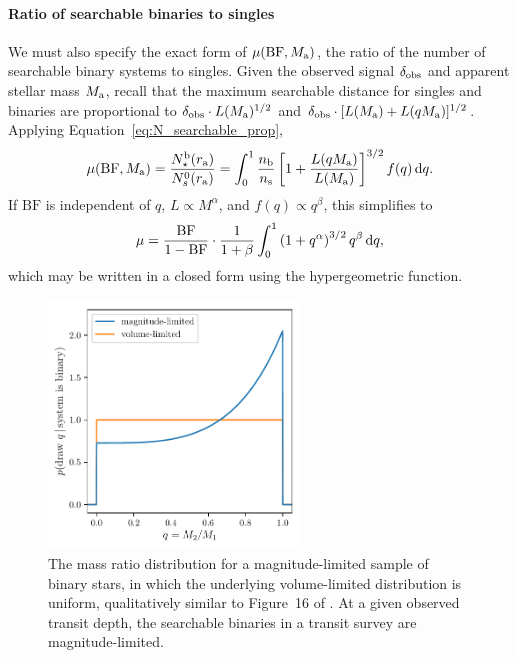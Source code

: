 \documentclass[12pt,modern]{aastex61}
\renewcommand{\a}{_{\rm a}}
\begin{document}
\paragraph{Ratio of searchable binaries to singles}
We must also specify the exact form of $\mu({\rm BF},M\a)$, the ratio of 
the number of searchable binary systems to singles.
Given the observed signal $\delta_{\rm obs}$ and apparent stellar mass $M\a$, 
recall that the maximum searchable distance for singles and binaries are 
proportional to $\delta_{\rm obs}\cdot L(M\a)^{1/2}$ and $\delta_{\rm 
obs}\cdot [L(M\a)+L(qM\a)]^{1/2}$.
Applying Equation~\ref{eq:N_searchable_prop},
\begin{equation}
\mu({\rm BF},M\a) = 
\frac{N_\star^{\rm b}(r\a)}{N_s^0(r\a)}=
\int_0^1 {n_{\rm b}\over n_{\rm s}}\left[1+{L(qM\a) \over L(M\a)}\right]^{3/2} 
f(q)\,\mathrm{d}q.
\label{eq:mu_general}
\end{equation}
If $\mathrm{BF}$ is independent of $q$, $L \propto M^\alpha$, and $f(q) 
\propto q^\beta$, this simplifies to
\begin{equation}
\mu =\frac{{\rm BF}}{1 - {\rm BF}}\cdot {1\over{1+\beta}}\int_0^1 
\left(1+q^\alpha\right)^{3/2} q^\beta \,\mathrm{d}q,
\label{eq:mu_power_laws}
\end{equation}
which may be written in a closed form using the hypergeometric function.

\begin{figure}[!tb]
    \centering
    \includegraphics[width=0.6\textwidth]{figures/mass_ratio_distribution.pdf}
    \caption{
        The mass ratio distribution for a magnitude-limited sample of 
        binary stars, in which the underlying volume-limited distribution is 
        uniform, qualitatively similar to
        Figure~16 of \citet{raghavan_survey_2010}.
        At a given observed transit depth, the searchable binaries in a 
        transit survey are magnitude-limited.
    }
    \label{fig:q_distribn_mag_limited}
\end{figure}
\end{document}
